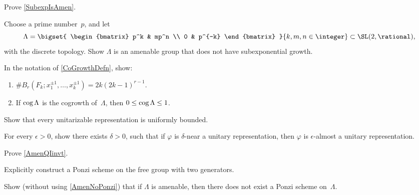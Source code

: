 \begin{exercises}

\item \label{SubexpIsAmenEx}
Prove \cref{SubexpIsAmen}.

\item \label{AmenNotSubExpEx}
Choose a prime number~$p$, and let
	$$ \Lambda = \bigset{
	\begin{bmatrix} p^k & mp^n \\ 0 & p^{-k} \end{bmatrix} 
	}{ k,m,n \in \integer}
	\subset \SL(2,\rational) ,$$
with the discrete topology. Show $\Lambda$ is an amenable group that does not have subexponential growth.

\item \label{CoGrowthBtwn01Ex}
In the notation of \cref{CoGrowthDefn}, show:
	\begin{enumerate}
	\item $\# B_r(F_k; x_1^{\pm1},\ldots,x_k^{\pm1}) = 2k(2k-1)^{r-1}$.
	\item If $\mathop{\text{\rm cog}} \Lambda$ is the cogrowth of~$\Lambda$, then $0 \le \mathop{\text{\rm cog}} \Lambda \le 1$.
	\end{enumerate}

\item \label{UnitIsUnifBddEx}
Show that every unitarizable representation is uniformly bounded.

\item For every $\epsilon > 0$, show there exists $\delta > 0$, such that if $\varphi$ is $\delta$-near a unitary representation, then $\varphi$ is $\epsilon$-almost a unitary representation.

\item \label{AmenQIinvtEx}
Prove \cref{AmenQIinvt}.

\item Explicitly construct a Ponzi scheme on the free group with two generators.

\item Show (without using \cref{AmenNoPonzi}) that if $\Lambda$ is amenable, then there does not exist a Ponzi scheme on~$\Lambda$.

\end{exercises}



